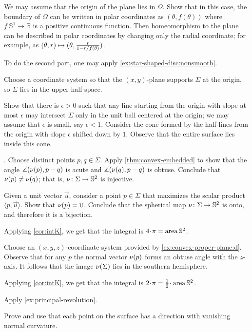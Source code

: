 \begin{multicols}{2}
We may assume that the origin of the plane lies in $\Omega$.
Show that in this case, the boundary of $\Omega$ can be written in polar coordinates as $(\theta,f(\theta))$ where $f\:\mathbb{S}^1\to\mathbb{R}$ is a positive continuous function.
Then homeomorphism to the plane can be described in polar coordinates by changing only the radial coordinate;
for example, as 
$(\theta,r)\z\mapsto (\theta,
\tfrac{r}{1-r/f(\theta)})$.

To do the second part, one may apply \ref{ex:star-shaped-disc:nonsmooth}.


Choose a coordinate system so that the $(x,y)$-plane supports $\Sigma$ at the origin, so $\Sigma$ lies in the upper half-space. 

Show that there is $\epsilon>0$ such that any line starting from the origin with slope at most $\epsilon$ may intersect $\Sigma$ only in the unit ball centered at the origin;
we may assume that $\epsilon$ is small, say $\epsilon<1$.
Consider the cone formed by the half-lines from the origin with slope $\epsilon$ shifted down by $1$.
Observe that the entire surface lies inside this cone.

\parbf{\ref{ex:intK}}.
Choose distinct points $p,q\in\Sigma$.
Apply \ref{thm:convex-embedded} to show that the angle 
$\measuredangle(\nu(p),p-q)$ is acute and $\measuredangle(\nu(q),p-q)$ is obtuse.
Conclude that $\nu(p)\ne\nu(q)$;
that is, $\nu\colon\Sigma\to\mathbb{S}^2$ is injective.

Given a unit vector $\vec u$, consider a point $p\in \Sigma$ that maximizes the scalar product $\langle p,\vec u\rangle$.
Show that $\nu(p)=\text{\sc{u}}$.
Conclude that the spherical map $\nu\colon\Sigma\to\mathbb{S}^2$ is onto, and therefore it is a bijection.

Applying \ref{cor:intK}, we get that the integral is $4\cdot\pi=\area\mathbb{S}^2$.

 Choose an $(x,y,z)$-coordinate system provided by \ref{ex:convex-proper-plane:d}.
Observe that for any $p$ the normal vector $\nu(p)$ forms an obtuse angle with the $z$-axis.
It follows that the image $\nu(\Sigma)$ lies in the southern hemisphere.

Applying \ref{cor:intK}, we get that the integral is $2\cdot\pi=\tfrac12\cdot\area\mathbb{S}^2$.

Apply \ref{ex:principal-revolution}.

Prove and use that each point on the surface has a direction with vanishing normal curvature.


\end{multicols}
